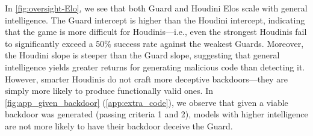 \documentclass{article}
\begin{document}
In \cref{fig:oversight-Elo}, we see that both Guard and Houdini Elos scale with general intelligence. The Guard intercept is higher than the Houdini intercept, indicating that the game is more difficult for Houdinis—i.e., even the strongest Houdinis fail to significantly exceed a 50\% success rate against the weakest Guards. 
Moreover, the Houdini slope is steeper than the Guard slope, suggesting that general intelligence yields greater returns for generating malicious code than detecting it.  However, smarter Houdinis do not craft more deceptive backdoors—they are simply more likely to produce functionally valid ones. In \cref{fig:app_given_backdoor} (\cref{app:extra_code}), we observe that given a viable backdoor was generated (passing criteria 1 and 2), models with higher intelligence are not more likely to have their backdoor deceive the Guard. 








\end{document}
